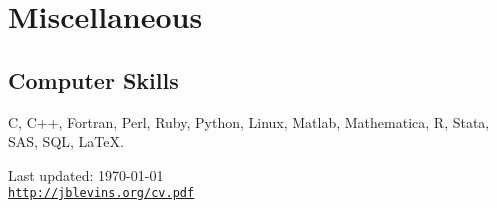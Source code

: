 \documentclass[letterpaper]{article}
\begin{document}
\section*{Miscellaneous}

\subsection*{Computer Skills}

C, C++, Fortran, Perl, Ruby, Python, Linux,
Matlab, Mathematica, R, Stata, SAS, SQL, \LaTeX.

\bigskip

\begin{center}
\begin{footnotesize}
Last updated: \today \\
\href{http://jblevins.org/cv}{\tt http://jblevins.org/cv.pdf}
\end{footnotesize}
\end{center}
\end{document}
